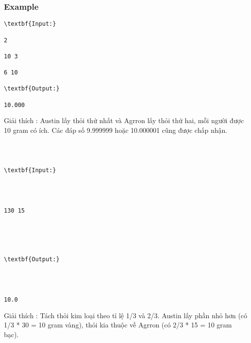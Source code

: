 \subsubsection{   Example  }
\begin{verbatim}
\textbf{Input:}

2

10 3

6 10

\textbf{Output:}

10.000\end{verbatim}

Giải thích        : Austin lấy thỏi thứ nhất và Agrron lấy thỏi thứ hai, mỗi người được 10 gram có ích. Các đáp số 9.999999 hoặc 10.000001 cũng được chấp nhận.
\begin{verbatim}



\textbf{Input:}




130 15





\textbf{Output:}




10.0\end{verbatim}

Giải thích        : Tách thỏi kim loại theo tỉ lệ 1/3 và 2/3. Austin lấy phần nhỏ hơn (có 1/3 * 30 = 10 gram vàng), thỏi kia thuộc về Agrron (có 2/3 * 15 = 10 gram bạc).
